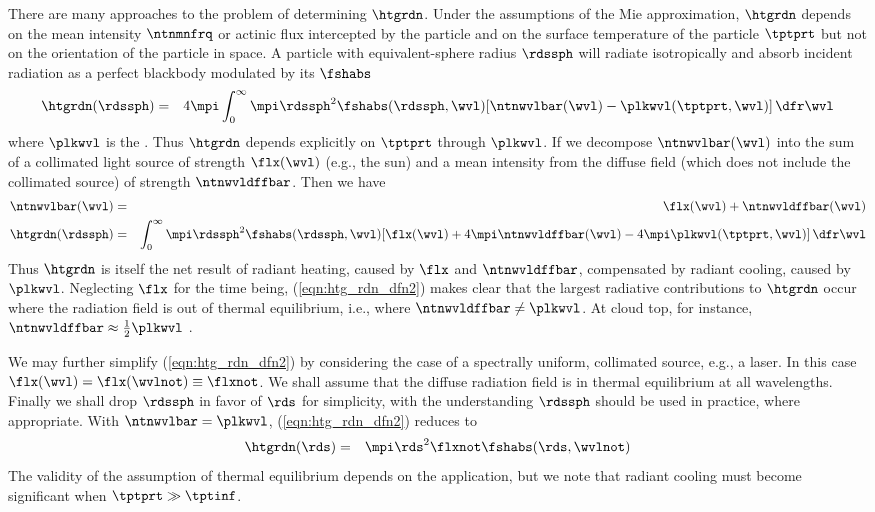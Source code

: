 \documentclass[12pt,twoside]{book}
\begin{document}
There are many approaches to the problem of determining $\htgrdn$.
Under the assumptions of the Mie approximation, $\htgrdn$ depends on
the mean intensity $\ntnmnfrq$ or actinic flux intercepted by the
particle and on the surface temperature of the particle $\tptprt$ but
not on the orientation of the particle in space.
A particle with equivalent-sphere radius $\rdssph$ will radiate
isotropically and absorb incident radiation as a perfect blackbody
modulated by its  $\fshabs$
\begin{eqnarray}
\htgrdn(\rdssph) & = & 4\mpi \int_{0}^{\infty} 
\mpi \rdssph^{2} \fshabs( \rdssph, \wvl ) 
[ \ntnwvlbar(\wvl) - \plkwvl(\tptprt,\wvl) ] \,\dfr\wvl
\label{eqn:htg_rdn_dfn}
\end{eqnarray}
where $\plkwvl$ is the .
Thus $\htgrdn$ depends explicitly on $\tptprt$ through $\plkwvl$.
If we decompose $\ntnwvlbar(\wvl)$ into the sum of a collimated
light source of strength $\flx(\wvl)$ (e.g., the sun) and a mean
intensity from the diffuse field (which does not include the
collimated source) of strength $\ntnwvldffbar$.
Then we have
\begin{eqnarray}
\ntnwvlbar( \wvl ) & = & \flx( \wvl ) + \ntnwvldffbar( \wvl ) \\
\htgrdn(\rdssph) & = & \int_{0}^{\infty} 
\mpi \rdssph^{2} \fshabs ( \rdssph, \wvl ) 
[ \flx( \wvl ) + 
4 \mpi \ntnwvldffbar ( \wvl ) - 4\mpi \plkwvl ( \tptprt, \wvl) ] \,\dfr\wvl
\label{eqn:htg_rdn_dfn2}
\end{eqnarray}
Thus $\htgrdn$ is itself the net result of radiant heating, caused by
$\flx$ and $\ntnwvldffbar$, compensated by radiant cooling, caused
by $\plkwvl$.
Neglecting $\flx$ for the time being, (\ref{eqn:htg_rdn_dfn2})
makes clear that the largest radiative contributions to $\htgrdn$
occur where the radiation field is out of thermal equilibrium, i.e.,
where $\ntnwvldffbar \ne \plkwvl$.
At cloud top, for instance, 
$\ntnwvldffbar \approx \frac{1}{2} \plkwvl$ \cite[][]{Bar78}.

We may further simplify (\ref{eqn:htg_rdn_dfn2}) by considering the
case of a spectrally uniform, collimated source, e.g., a laser.
In this case $\flx( \wvl ) = \flx(\wvlnot) \equiv \flxnot$.
We shall assume that the diffuse radiation field is in thermal
equilibrium at all wavelengths. 
Finally we shall drop $\rdssph$ in favor of $\rds$ for simplicity, 
with the understanding $\rdssph$ should be used in practice, where
appropriate.
With $\ntnwvlbar = \plkwvl$, (\ref{eqn:htg_rdn_dfn2}) reduces to
\begin{eqnarray}
\htgrdn(\rds) & = & \mpi \rds^{2} \flxnot \fshabs ( \rds, \wvlnot )
\label{eqn:htg_rdn_dfn3}
\end{eqnarray}
The validity of the assumption of thermal equilibrium depends on the
application, but we note that radiant cooling must become significant
when $\tptprt \gg \tptinf$. 
\end{document}
